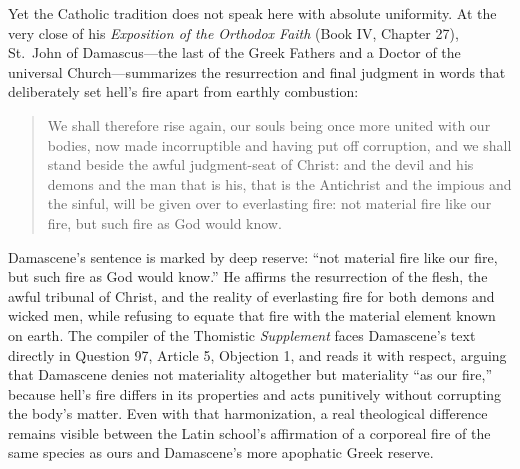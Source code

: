 Yet the Catholic tradition does not speak here with absolute uniformity. At the very close of his \textit{Exposition of the Orthodox Faith} (Book IV, Chapter 27), St.\ John of Damascus---the last of the Greek Fathers and a Doctor of the universal Church---summarizes the resurrection and final judgment in words that deliberately set hell's fire apart from earthly combustion:

\begin{quote}
We shall therefore rise again, our souls being once more united with our bodies, now made incorruptible and having put off corruption, and we shall stand beside the awful judgment-seat of Christ: and the devil and his demons and the man that is his, that is the Antichrist and the impious and the sinful, will be given over to everlasting fire: not material fire like our fire, but such fire as God would know.
\end{quote}

Damascene's sentence is marked by deep reserve: ``not material fire like our fire, but such fire as God would know.'' He affirms the resurrection of the flesh, the awful tribunal of Christ, and the reality of everlasting fire for both demons and wicked men, while refusing to equate that fire with the material element known on earth. The compiler of the Thomistic \textit{Supplement} faces Damascene's text directly in Question 97, Article 5, Objection 1, and reads it with respect, arguing that Damascene denies not materiality altogether but materiality ``as our fire,'' because hell's fire differs in its properties and acts punitively without corrupting the body's matter. Even with that harmonization, a real theological difference remains visible between the Latin school's affirmation of a corporeal fire of the same species as ours and Damascene's more apophatic Greek reserve.


